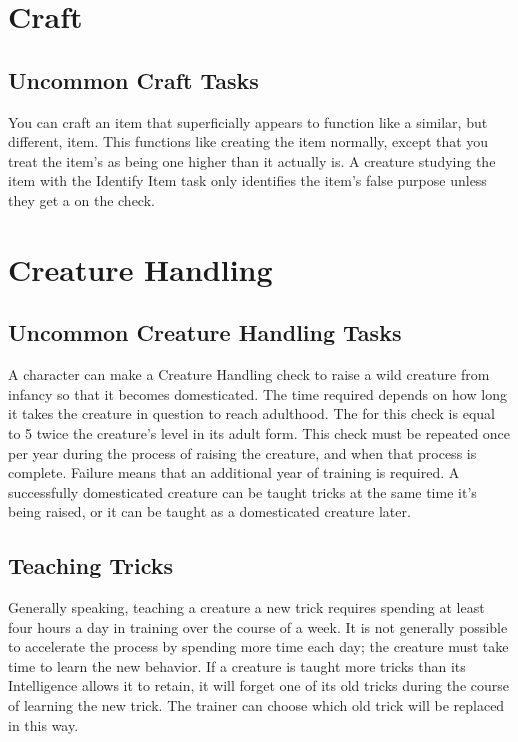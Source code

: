 \section{Craft}

    \subsection{Uncommon Craft Tasks}
         You can craft an item that superficially appears to function like a similar, but different, item.
        This functions like creating the item normally, except that you treat the item's  as being one higher than it actually is.
        A creature studying the item with the Identify Item task only identifies the item's false purpose unless they get a  on the check.

\section{Creature Handling}

    \subsection{Uncommon Creature Handling Tasks}
         A character can make a Creature Handling check to raise a wild creature from infancy so that it becomes domesticated. 
        The time required depends on how long it takes the creature in question to reach adulthood.
        The  for this check is equal to 5 \add twice the creature's level in its adult form.
        This check must be repeated once per year during the process of raising the creature, and when that process is complete.
        Failure means that an additional year of training is required.
        A successfully domesticated creature can be taught tricks at the same time it's being raised, or it can be taught as a domesticated creature later.

    \subsection{Teaching Tricks}
        Generally speaking, teaching a creature a new trick requires spending at least four hours a day in training over the course of a week.
        It is not generally possible to accelerate the process by spending more time each day; the creature must take time to learn the new behavior.
        If a creature is taught more tricks than its Intelligence allows it to retain, it will forget one of its old tricks during the course of learning the new trick.
        The trainer can choose which old trick will be replaced in this way.


